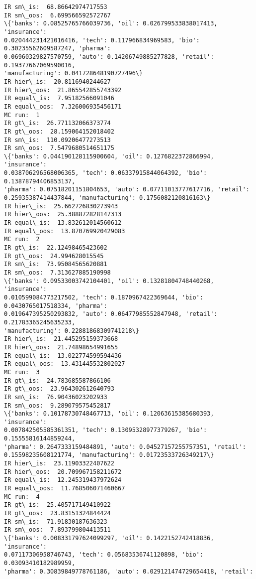\documentclass[11pt]{article}
\begin{document}
    \begin{Verbatim}[commandchars=\\\{\},fontsize=\footnotesize]
IR sm\_is:  68.86642974717553
IR sm\_oos:  6.699566592572767
\{'banks': 0.08525765766039736, 'oil': 0.026799533838017413, 'insurance':
0.020444231421016416, 'tech': 0.117966834969583, 'bio': 0.30235562609587247, 'pharma':
0.06960329827570759, 'auto': 0.14206749885277828, 'retail': 0.19377667069590016,
'manufacturing': 0.041728648190727496\}
IR hier\_is:  20.8116940244627
IR hier\_oos:  21.865542855743392
IR equal\_is:  7.95182566091046
IR equal\_oos:  7.326006935456171
MC run:  1
IR gt\_is:  26.771132066373774
IR gt\_oos:  28.159064152018402
IR sm\_is:  110.09206477273513
IR sm\_oos:  7.5479680514651175
\{'banks': 0.044190128115900604, 'oil': 0.1276822372866994, 'insurance':
0.038706296568006365, 'tech': 0.06337915844064392, 'bio': 0.13878794406853137,
'pharma': 0.07518201151804653, 'auto': 0.07711013777617716, 'retail':
0.25935387414437844, 'manufacturing': 0.1756082120816163\}
IR hier\_is:  25.662726830273943
IR hier\_oos:  25.388872828147313
IR equal\_is:  13.832612014560612
IR equal\_oos:  13.870769920429083
MC run:  2
IR gt\_is:  22.12498465423602
IR gt\_oos:  24.994628015545
IR sm\_is:  73.95084565620881
IR sm\_oos:  7.313627885190998
\{'banks': 0.09533003742104401, 'oil': 0.13281804748440268, 'insurance':
0.010599084773217502, 'tech': 0.1870967422369644, 'bio': 0.0430765017518334, 'pharma':
0.019647395250293832, 'auto': 0.06477985552847948, 'retail': 0.21783365245635233,
'manufacturing': 0.22881868309741218\}
IR hier\_is:  21.445295159373668
IR hier\_oos:  21.74898654991655
IR equal\_is:  13.022774599594436
IR equal\_oos:  13.431445532802027
MC run:  3
IR gt\_is:  24.783685587866106
IR gt\_oos:  23.964302612640793
IR sm\_is:  76.90436023202933
IR sm\_oos:  9.289079575452817
\{'banks': 0.10178730748467713, 'oil': 0.12063615385680393, 'insurance':
0.007842505585361351, 'tech': 0.13095328977379267, 'bio': 0.15555816144859244,
'pharma': 0.2647333159484891, 'auto': 0.04527157255757351, 'retail':
0.15598235608121774, 'manufacturing': 0.01723533726349217\}
IR hier\_is:  23.11903322407622
IR hier\_oos:  20.709967158211672
IR equal\_is:  12.245319437972624
IR equal\_oos:  11.768506071460667
MC run:  4
IR gt\_is:  25.405717149410922
IR gt\_oos:  23.83151324844424
IR sm\_is:  71.91830187636323
IR sm\_oos:  7.893799804413511
\{'banks': 0.008331797624099297, 'oil': 0.1422152742418836, 'insurance':
0.07117306958746743, 'tech': 0.05683536741120898, 'bio': 0.03093410182989959,
'pharma': 0.30839849778761186, 'auto': 0.029121474729654418, 'retail':

\end{Verbatim}
\end{document}
